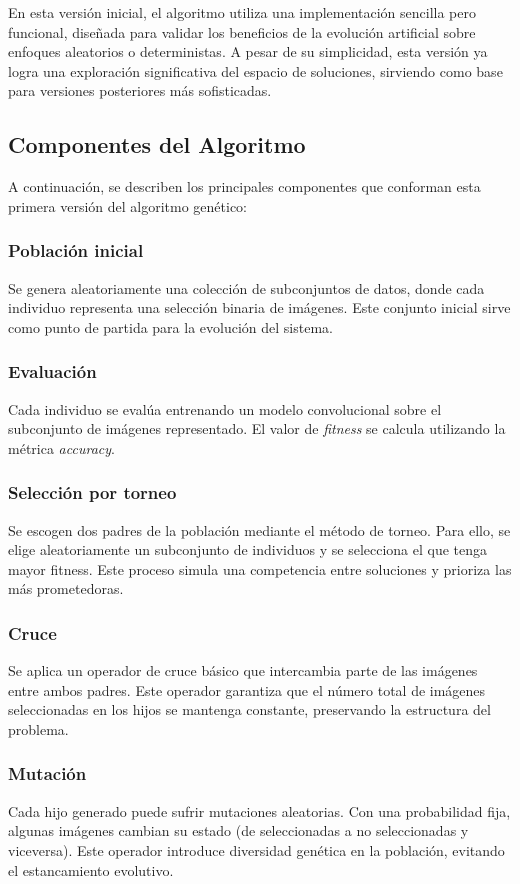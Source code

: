 En esta versión inicial, el algoritmo utiliza una implementación sencilla pero funcional,
diseñada para validar los beneficios de la evolución artificial sobre enfoques aleatorios o deterministas.
A pesar de su simplicidad, esta versión ya logra una exploración significativa del espacio de soluciones,
sirviendo como base para versiones posteriores más sofisticadas.

\subsection{Componentes del Algoritmo}\label{subsec:componentes-genetico-v1}

A continuación, se describen los principales componentes que conforman esta primera versión del algoritmo genético:

\subsubsection{Población inicial}
Se genera aleatoriamente una colección de subconjuntos de datos, donde cada individuo representa una selección binaria de imágenes.
Este conjunto inicial sirve como punto de partida para la evolución del sistema.

\subsubsection{Evaluación}
Cada individuo se evalúa entrenando un modelo convolucional sobre el subconjunto de imágenes representado.
El valor de \textit{fitness} se calcula utilizando la métrica \textit{accuracy}.
\subsubsection{Selección por torneo}
Se escogen dos padres de la población mediante el método de torneo.
Para ello, se elige aleatoriamente un subconjunto de individuos y se selecciona el que tenga mayor fitness.
Este proceso simula una competencia entre soluciones y prioriza las más prometedoras.
\subsubsection{Cruce}
Se aplica un operador de cruce básico que intercambia parte de las imágenes entre ambos padres.
Este operador garantiza que el número total de imágenes seleccionadas en los hijos se mantenga constante, preservando la estructura del problema.
\subsubsection{Mutación}
Cada hijo generado puede sufrir mutaciones aleatorias.
Con una probabilidad fija, algunas imágenes cambian su estado (de seleccionadas a no seleccionadas y viceversa).
Este operador introduce diversidad genética en la población, evitando el estancamiento evolutivo.
